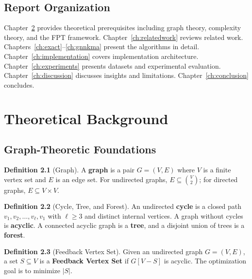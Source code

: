 \documentclass[10pt,a4paper]{report}
\theoremstyle{definition}
\newtheorem{definition}{Definition}[chapter]
\begin{document}
\section{Report Organization}

Chapter~\ref{ch:background} provides theoretical prerequisites including graph theory, complexity theory, and the FPT framework. Chapter~\ref{ch:relatedwork} reviews related work. Chapters~\ref{ch:exact}--\ref{ch:gnnkma} present the algorithms in detail. Chapter~\ref{ch:implementation} covers implementation architecture. Chapter~\ref{ch:experiments} presents datasets and experimental evaluation. Chapter~\ref{ch:discussion} discusses insights and limitations. Chapter~\ref{ch:conclusion} concludes.



\chapter{Theoretical Background}
\label{ch:background}

\section{Graph-Theoretic Foundations}

\begin{definition}[Graph]
	A \textbf{graph} is a pair $G=(V,E)$ where $V$ is a finite vertex set and $E$ is an edge set. For undirected graphs, $E \subseteq \binom{V}{2}$; for directed graphs, $E \subseteq V \times V$.
\end{definition}

\begin{definition}[Cycle, Tree, and Forest]
	An undirected \textbf{cycle} is a closed path $v_1,v_2,\dots,v_\ell,v_1$ with $\ell\ge 3$ and distinct internal vertices. A graph without cycles is \textbf{acyclic}. A connected acyclic graph is a \textbf{tree}, and a disjoint union of trees is a \textbf{forest}.
\end{definition}

\begin{definition}[Feedback Vertex Set]
	Given an undirected graph $G=(V,E)$, a set $S\subseteq V$ is a \textbf{Feedback Vertex Set} if $G[V - S]$ is acyclic. The optimization goal is to minimize $|S|$.
\end{definition}
\end{document}
